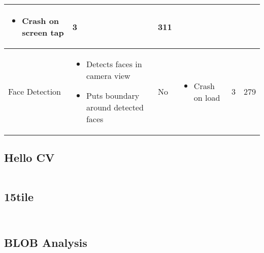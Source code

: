 \documentclass[a4paper, 12pt, hidelinks]{article}
\begin{document}
\begin{landscape}
\begin{table}[h!]
\begin{tabular}{|l|p{}|l|p{}|r|r|}
\begin{itemize}[noitemsep,topsep=0pt,parsep=0pt]
					\item{Crash on screen tap}
				\end{itemize}&
				3&
				311\\
				\hline
				Face Detection&
				\begin{itemize}[noitemsep,topsep=0pt,parsep=0pt]
					\item{Detects faces in camera view}
					\item{Puts boundary around detected faces}
				\end{itemize}&
				No&
				\begin{itemize}[noitemsep,topsep=0pt,parsep=0pt]
					\item{Crash on load}
				\end{itemize}&
				3&
				279\\
				\hline
			\end{tabular}
		\end{table}
	\end{landscape}
	\restoregeometry
	\subsection{Hello CV}
	\inputminted[breaklines,
					linenos,
					frame=lines,
					fontsize=\footnotesize]{java}{../code/android/hello_cv/MainActivity.java}
	\subsection{15tile}
	\inputminted[breaklines,
					linenos,
					frame=lines,
					fontsize=\footnotesize]{java}{../code/android/15tile/MainActivity.java}
	\inputminted[breaklines,
					linenos,
					frame=lines,
					fontsize=\footnotesize]{java}{../code/android/15tile/PuzzleProcessor.java}
	\subsection{BLOB Analysis}
	\inputminted[breaklines,
					linenos,
					frame=lines,
					fontsize=\footnotesize]{java}{../code/android/blob_analysis/ColorBlobDetectionActivity.java}
	\inputminted[breaklines,
					linenos,
					frame=lines,
					fontsize=\footnotesize]{java}{../code/android/blob_analysis/ColorBlobDetector.java}
\end{document}
